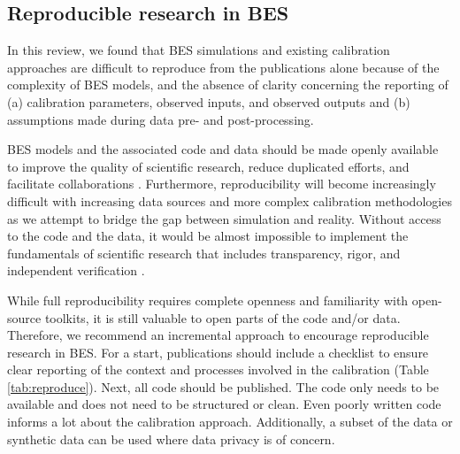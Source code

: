 \documentclass[review]{elsarticle}
\begin{document}
\subsection{Reproducible research in BES} \label{sec:reproduce}

In this review, we found that BES simulations and existing calibration approaches are difficult to reproduce from the publications alone because of the complexity of BES models, and the absence of clarity concerning the reporting of (a) calibration parameters, observed inputs, and observed outputs and (b) assumptions made during data pre- and post-processing.

BES models and the associated code and data should be made openly available to improve the quality of scientific research, reduce duplicated efforts, and facilitate collaborations \cite{pfenninger2017importance}. Furthermore, reproducibility will become increasingly difficult with increasing data sources and more complex calibration methodologies as we attempt to bridge the gap between simulation and reality. Without access to the code and the data, it would be almost impossible to implement the fundamentals of scientific research that includes transparency, rigor, and independent verification \cite{mcnutt2014journals, pfenninger2017importance}. 

While full reproducibility requires complete openness and familiarity with open-source toolkits, it is still valuable to open parts of the code and/or data. Therefore, we recommend an incremental approach to encourage reproducible research in BES. For a start, publications should include a checklist to ensure clear reporting of the context and processes involved in the calibration (Table \ref{tab:reproduce}). Next, all code should be published. The code only needs to be available and does not need to be structured or clean. Even poorly written code informs a lot about the calibration approach. Additionally, a subset of the data or synthetic data can be used where data privacy is of concern. 
\end{document}
